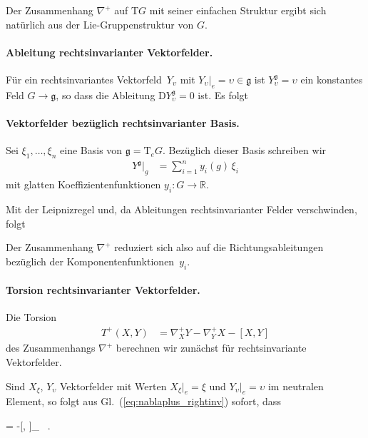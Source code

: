 \documentclass[10pt,a4paper]{article}
\newcommand*\resultbox[1]{%
  \colorbox{yaleblue!10}{\hspace{1em}#1\hspace{1em}}}
\theoremstyle{mytheorem}
\theoremstyle{mydefinition}
\newcommand{\dt}{\mathrm{d}}
\newcommand{\Dt}{\mathrm{D}}
\newcommand{\Tt}{\mathrm{T}}
\begin{document}
Der Zusammenhang $\nabla^+$ auf $\Tt G$ mit seiner einfachen Struktur ergibt sich natürlich aus der Lie-Gruppenstruktur von $G$.

\paragraph{Ableitung rechtsinvarianter Vektorfelder.}
Für ein rechtsinvariantes Vektorfeld~$Y_\upsilon$ mit $Y_\upsilon|_e=\upsilon\in\mathfrak{g}$ ist $Y_\upsilon^\mathfrak{g}=\upsilon$ ein konstantes Feld $G\rightarrow\mathfrak{g}$, so dass die Ableitung $\Dt Y_\upsilon^\mathfrak{g}=0$ ist.
Es folgt

\paragraph{Vektorfelder bezüglich rechtsinvarianter Basis.}
Sei $\xi_1,\ldots,\xi_n$ eine Basis von $\mathfrak{g}=\Tt_eG$.
Bezüglich dieser Basis schreiben wir
\begin{align*}
	Y^\mathfrak{g}|_g
	&= \sum_{i=1}^n y_i(g)\,\xi_i
\end{align*}
mit glatten Koeffizientenfunktionen $y_i:G\rightarrow\mathbb{R}$.

Mit der Leipnizregel und, da Ableitungen rechtsinvarianter Felder verschwinden, folgt
Der Zusammenhang $\nabla^{+}$ reduziert sich also auf die Richtungsableitungen bezüglich der Komponentenfunktionen~$y_i$.

\paragraph{Torsion rechtsinvarianter Vektorfelder.}
Die Torsion 
\begin{align*}
	T^+(X,Y)
	&= \nabla^+_XY - \nabla^+_YX - [X,Y]
\end{align*}
des Zusammenhangs $\nabla^+$ berechnen wir zunächst für rechtsinvariante Vektorfelder.

Sind $X_\xi$, $Y_\upsilon$ Vektorfelder mit Werten $X_\xi|_e=\xi$ und $Y_\upsilon|_e=\upsilon$ im neutralen Element, so folgt aus Gl.~(\ref{eq:nablaplus_rightinv}) sofort, dass
\begin{empheq}[box=\resultbox]{align}
	T^+(X_\xi, Y_\upsilon)
	&=
	-[X_\xi, Y_\upsilon]
	= -[\xi, \upsilon]_
	\ .
\end{empheq}
\end{document}
